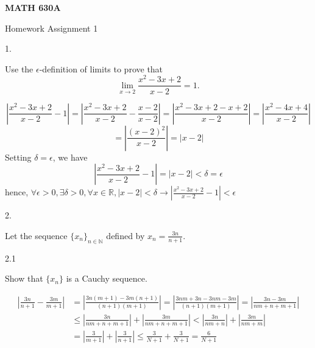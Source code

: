 \documentclass[12pt,a4paper]{article}
\author{Jackson Autry}
\begin{document}

	
\begin{center}
	\textbf{MATH 630A} %
	
		Homework Assignment 1		%
	
\end{center}
1. 
\begin{ques}
	Use the $\epsilon$-definition of limits to prove that
	\[ 
	\lim\limits_{x \rightarrow 2}\frac{x^2-3x+2}{x-2} = 1.
	\]
\end{ques}
	
	\[
	\left| \frac{x^2-3x+2}{x-2} - 1 \right| = \left| \frac{x^2-3x+2}{x-2} - \frac{x-2}{x-2} \right| = \left| \frac{x^2 - 3x + 2 - x + 2}{x - 2} \right| = \left| \frac{x^2 - 4x + 4}{x-2} \right| 
	\]
	\[
	= \left| \frac{(x - 2)^2}{x-2} \right| = \left| {x - 2} \right|
	\]
	Setting $\delta = \epsilon$, we have 
	\[
	\left| \frac{x^2-3x+2}{x-2} - 1 \right| = \left| x-2 \right| < \delta = \epsilon
	\]
	hence, $\forall \epsilon > 0, \exists \delta > 0, \forall x \in \mathbb{R}, |x - 2| < \delta \longrightarrow \left| \frac{x^2 - 3x + 2}{x - 2} - 1 \right| < \epsilon$ 
	
2.
\begin{ques}
	Let the sequence $\{x_n\}_{n \in \mathbb{N}}$ defined by $x_n = \frac{3n}{n+1}.$
\end{ques}

2.1
\begin{ques}
	Show that $\{x_n\}$ is a Cauchy sequence.
\end{ques}

\begin{equation*}
\begin{split}
\left| \frac{3n}{n+1} - \frac{3m}{m+1} \right| & = \left| \frac{3n(m+1) - 3m(n+1)}{(n+1)(m+1)} \right| = \left| \frac{3nm + 3n - 3nm - 3m}{(n+1)(m+1)} \right| = \left| \frac{3n - 3m}{nm + n + m + 1} \right| \\
 & \leq \left| \frac{3n}{nm + n + m + 1} \right| + \left| \frac{3m}{nm + n + m + 1} \right| < \left| \frac{3n}{nm + n} \right| + \left| \frac{3m}{nm + m} \right| \\
 & = \left| \frac{3}{m + 1} \right| + \left| \frac{3}{n + 1} \right| \leq \frac{3}{N + 1} + \frac{3}{N + 1} = \frac{6}{N + 1}
\end{split}
\end{equation*}
\end{document}
